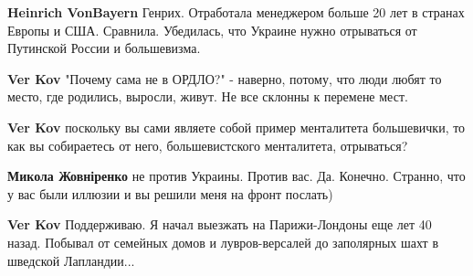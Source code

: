 \begin{itemize}
\begin{itemize}
 
\textbf{Heinrich VonBayern} Генрих. Отработала менеджером больше 20 лет в странах Европы и США. Сравнила. Убедилась, что Украине нужно отрываться от Путинской России и большевизма.

 
\textbf{Ver Kov} "Почему сама не в ОРДЛО?" - наверно, потому, что люди любят то место, где родились, выросли, живут. Не все склонны к перемене мест.

 
\textbf{Ver Kov} поскольку вы сами являете собой пример менталитета большевички, то как вы собираетесь от него, большевистского менталитета, отрываться?

 
\textbf{Микола Жовніренко} не против Украины. Против вас. Да. Конечно. Странно, что у вас были иллюзии и вы решили меня на фронт послать)

 
\textbf{Ver Kov} Поддерживаю. Я начал выезжать на Парижи-Лондоны еще лет 40 назад. Побывал от семейных домов и лувров-версалей до заполярных шахт в шведской Лапландии...

 

\end{itemize}
\end{itemize}
